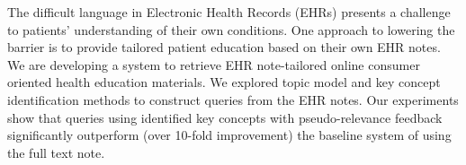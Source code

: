 The difficult language in Electronic Health Records (EHRs) presents a challenge to patients' understanding of their own conditions. One approach to lowering the barrier is to provide tailored patient education based on their own EHR notes. We are developing a system to retrieve EHR note-tailored online consumer oriented health education materials. We explored topic model and key concept identification methods to construct queries from the EHR notes. Our experiments show that queries using identified key concepts with pseudo-relevance feedback significantly outperform (over 10-fold improvement) the baseline system of using the full text note.
